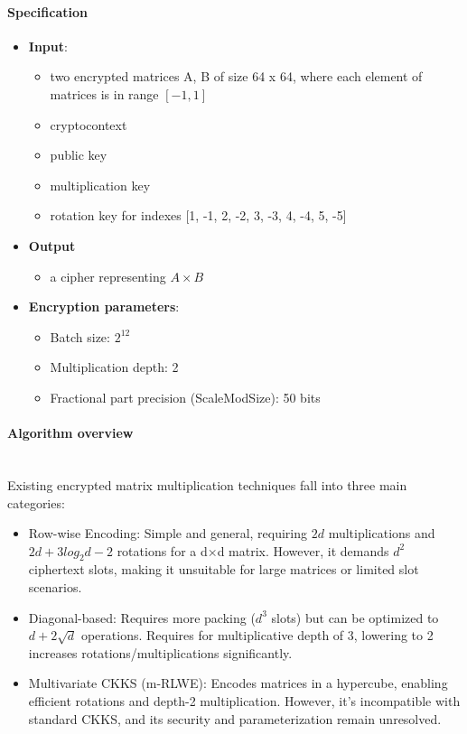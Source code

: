 \documentclass[article]{iacrtrans}
\begin{document}
\paragraph{Specification}
\begin{itemize}
    \item \textbf{Input}: 
        \begin{itemize}
           \item two encrypted matrices A, B of size  64 x 64, where each element of matrices is in range $[-1, 1]$
            \item cryptocontext
            \item public key
            \item multiplication key
            \item rotation key for indexes [1, -1, 2, -2, 3, -3, 4, -4, 5, -5]
        \end{itemize}
    \item \textbf{Output}
        \begin{itemize}
            \item a cipher representing $A \times B$
        \end{itemize}
    \item \textbf{Encryption parameters}:
        \begin{itemize}
            \item Batch size: $2^{12}$ 
            \item Multiplication depth: 2
            \item Fractional part precision (ScaleModSize): 50 bits
        \end{itemize}
\end{itemize}

\paragraph{Algorithm overview}\mbox{}\\

Existing encrypted matrix multiplication techniques fall into three main categories:
\begin{itemize}
    \item Row-wise Encoding: Simple and general, requiring $2d$ multiplications and $2d + 3 log_{2}d -2$ rotations for a d×d matrix. However, it demands 
    $d^2$ ciphertext slots, making it unsuitable for large matrices or limited slot scenarios.
    \item Diagonal-based: Requires more packing ($d^3$ slots) but can be optimized to $d+2 \sqrt d$ operations. Requires for multiplicative depth of 3, lowering to 2 increases rotations/multiplications significantly.
    \item Multivariate CKKS (m-RLWE): Encodes matrices in a hypercube, enabling efficient rotations   and depth-2 multiplication. However, it’s incompatible with standard CKKS, and its security and parameterization remain unresolved.
\end{itemize}
\end{document}
